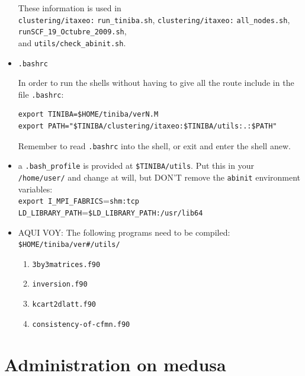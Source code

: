 \documentclass[12pt]{article}
\numberwithin{equation}{section}
\begin{document}
\begin{itemize}
 These information is used in\\ 
\verb=clustering/itaxeo:=
\verb=run_tiniba.sh=,
\verb=clustering/itaxeo:=
\verb=all_nodes.sh=, 
\verb=runSCF_19_Octubre_2009.sh=, \\and
 \verb=utils/check_abinit.sh=.
\label{av}

\item\verb=.bashrc=

In order to run
the shells without having to give all
the route include in the file
 \verb=.bashrc=:
\begin{verbatim}
export TINIBA=$HOME/tiniba/verN.M
export PATH="$TINIBA/clustering/itaxeo:$TINIBA/utils:.:$PATH"
\end{verbatim}
Remember to read \verb=.bashrc= into the shell, or exit and enter the
shell anew.
\item a \verb=.bash_profile= is provided at \verb=$TINIBA/utils=. Put
  this in your \verb=/home/user/= and change at will, but DON'T remove
  the \verb=abinit= environment variables:\\
\verb=export I_MPI_FABRICS==\verb=shm:tcp=\\
\verb=LD_LIBRARY_PATH==\verb=$LD_LIBRARY_PATH:/usr/lib64=

\item AQUI VOY: The following programs need to be compiled:\\
\verb=$HOME/tiniba/ver#/utils/=
\begin{enumerate}
\item \verb=3by3matrices.f90=
\item\verb=inversion.f90=
\item\verb=kcart2dlatt.f90=
\item\verb=consistency-of-cfmn.f90=
\end{enumerate}

\end{itemize}

\section{Administration  on medusa}
\end{document}
